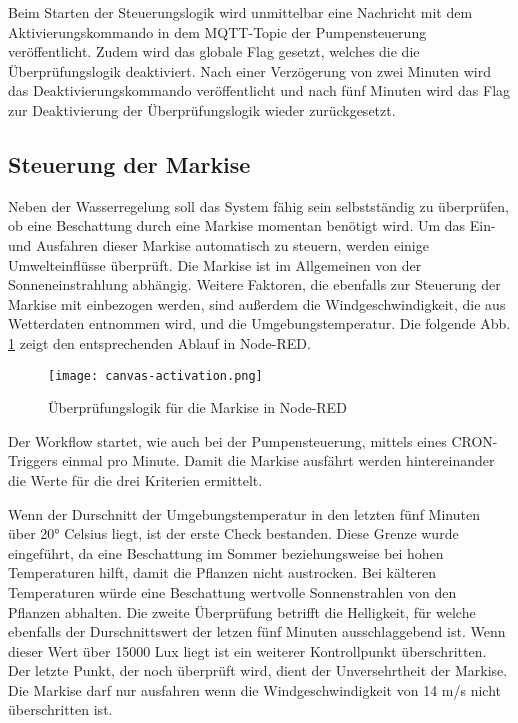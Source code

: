 Beim Starten der Steuerungslogik wird unmittelbar eine Nachricht mit dem Aktivierungskommando in dem MQTT-Topic der Pumpensteuerung veröffentlicht.
Zudem wird das globale Flag gesetzt, welches die die Überprüfungslogik deaktiviert.
Nach einer Verzögerung von zwei Minuten wird das Deaktivierungskommando veröffentlicht und nach fünf Minuten wird das Flag zur Deaktivierung der Überprüfungslogik wieder zurückgesetzt.

\subsection{Steuerung der Markise}

Neben der Wasserregelung soll das System fähig sein selbstständig zu überprüfen, ob eine Beschattung durch eine Markise momentan benötigt wird. Um  das Ein- und Ausfahren dieser Markise automatisch zu steuern, werden einige Umwelteinflüsse überprüft. Die Markise ist im Allgemeinen von der Sonneneinstrahlung abhängig. Weitere Faktoren, die ebenfalls zur Steuerung der Markise mit einbezogen werden, sind außerdem die Windgeschwindigkeit, die aus Wetterdaten entnommen wird, und die Umgebungstemperatur. 
Die folgende Abb. \ref{fig:canvas-activation} zeigt den entsprechenden Ablauf in Node-RED.

\begin{figure}[h]
  \centering
  \texttt{[image: canvas-activation.png]}
  \caption{Überprüfungslogik für die Markise in Node-RED}\label{fig:canvas-activation}
\end{figure}

Der Workflow startet, wie auch bei der Pumpensteuerung, mittels eines CRON-Triggers einmal pro Minute. Damit die Markise ausfährt werden hintereinander die Werte für die drei Kriterien ermittelt. 

Wenn der Durschnitt der Umgebungstemperatur in den letzten fünf Minuten über 20° Celsius liegt, ist der erste Check bestanden. Diese Grenze wurde eingeführt, da eine Beschattung im Sommer beziehungsweise bei hohen Temperaturen hilft, damit die Pflanzen nicht austrocken. Bei kälteren Temperaturen würde eine Beschattung wertvolle Sonnenstrahlen von den Pflanzen abhalten. Die zweite Überprüfung betrifft die Helligkeit, für welche ebenfalls der Durschnittswert der letzen fünf Minuten ausschlaggebend ist. Wenn dieser Wert über 15000 Lux liegt ist ein weiterer Kontrollpunkt überschritten. Der letzte Punkt, der noch überprüft wird, dient der Unversehrtheit der Markise. Die Markise darf nur ausfahren wenn die Windgeschwindigkeit von 14 m/s nicht überschritten ist.


